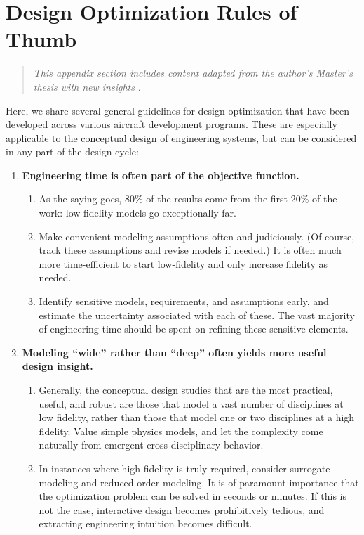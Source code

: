 \chapter{Design Optimization Rules of Thumb}

\begin{quote}
    \emph{This appendix section includes content adapted from the author's Master's thesis with new insights} \cite{sharpe_aerosandbox_2021}.
\end{quote}

Here, we share several general guidelines for design optimization that have been developed across various aircraft development programs. These are especially applicable to the conceptual design of engineering systems, but can be considered in any part of the design cycle:

\begin{enumerate}
    \item \textbf{Engineering time is often part of the objective function.}
    \begin{enumerate}
        \item As the saying goes, 80\% of the results come from the first 20\% of the work: low-fidelity models go exceptionally far.
        \item Make convenient modeling assumptions often and judiciously. (Of course, track these assumptions and revise models if needed.) It is often much more time-efficient to start low-fidelity and only increase fidelity as needed.
        \item Identify sensitive models, requirements, and assumptions early, and estimate the uncertainty associated with each of these. The vast majority of engineering time should be spent on refining these sensitive elements.
    \end{enumerate}
    \item \textbf{Modeling ``wide'' rather than ``deep'' often yields more useful design insight.}
    \begin{enumerate}
        \item Generally, the conceptual design studies that are the most practical, useful, and robust are those that model a vast number of disciplines at low fidelity, rather than those that model one or two disciplines at a high fidelity. Value simple physics models, and let the complexity come naturally from emergent cross-disciplinary behavior.
        \item In instances where high fidelity is truly required, consider surrogate modeling and reduced-order modeling. It is of paramount importance that the optimization problem can be solved in seconds or minutes. If this is not the case, interactive design becomes prohibitively tedious, and extracting engineering intuition becomes difficult.

\end{enumerate}
\end{enumerate}
